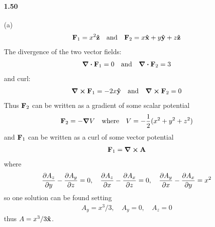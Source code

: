 \documentclass[../main.tex]{subfiles}
\begin{document}
\paragraph{1.50}
(a)
\begin{align*}
    \vb{F}_1 = x^2 \vu{z} \qand \vb{F}_2 = x \vu{x} + y \vu{y} + z \vu{z}
\end{align*}
The divergence of the two vector fields:
\begin{align*}
    \div \vb{F}_1 = 0 \qand \div \vb{F}_2 = 3
\end{align*}
and curl:
\begin{align*}
    \curl \vb{F}_1 = -2x \vu{y} \qand \curl \vb{F}_2 = 0
\end{align*}
Thus $\vb{F}_2$ can be written as a gradient of some scalar potential
\begin{align*}
    \vb{F}_2 = -\grad V \qq{where} V = -\frac{1}{2} (x^2 + y^2 + z^2)
\end{align*}
and $\vb{F}_1$ can be written as a curl of some vector potential
\begin{align*}
    \vb{F}_1 = \curl \vb{A}
\end{align*}
where
\begin{align*}
    \pdv{A_z}{y} - \pdv{A_y}{z} = 0 ,\quad
    \pdv{A_z}{x} - \pdv{A_x}{z} = 0 ,\quad
    \pdv{A_y}{x} - \pdv{A_x}{y} = x^2 
\end{align*}
so one solution can be found setting 
\begin{align*}
    A_y = x^3/3 , \quad A_y = 0 , \quad A_z = 0
\end{align*}
thus $A = x^3/3 \vu{x}$.
\end{document}
